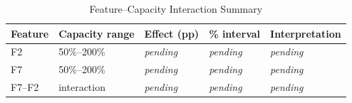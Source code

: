 \begin{table}[!t]
\caption{Feature--Capacity Interaction Summary}
\label{tab:interaction-effects}
\centering
\footnotesize
\begin{tabular}{@{}ll>{\centering\arraybackslash}l>{\centering\arraybackslash}l l@{}}
\toprule
Feature & Capacity range & Effect (pp) & 95\% interval & Interpretation \\
\midrule
F2 & 50\%--200\% & \textit{pending} & \textit{pending} & \textit{pending} \\
F7 & 50\%--200\% & \textit{pending} & \textit{pending} & \textit{pending} \\
F7--F2 & interaction & \textit{pending} & \textit{pending} & \textit{pending} \\
\bottomrule
\end{tabular}
\end{table}
